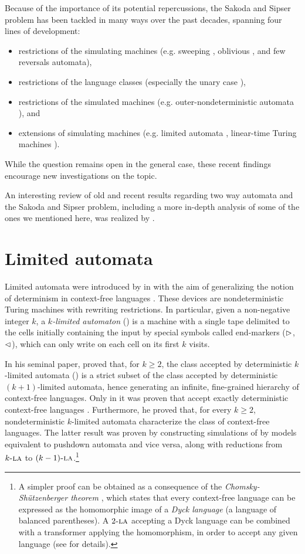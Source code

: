Because of the importance of its potential repercussions, the Sakoda and Sipser problem has been tackled in many ways over the past decades, spanning four lines of development:
\begin{itemize}
	\item restrictions of the simulating machines (e.g. sweeping \cite{Sip80}, oblivious \cite{HroSch03}, and few reversals \cite{Kap13} automata),
	\item restrictions of the language classes (especially the unary case \cite{GefMer+07}),
	\item restrictions of the simulated machines (e.g. outer-nondeterministic automata \cite{GefGui+14,KapPig15}), and
	\item extensions of simulating machines (e.g. limited automata \cite{PigPis14,PigPri19,GuiPri19,PigPri+22}, linear-time Turing machines \cite{Pru14,GuiPig+18,Hen65,GuiPig+23,Har68}).
\end{itemize}
While the question remains open in the general case, these recent findings encourage new investigations on the topic.

An interesting review of old and recent results regarding two way automata and the Sakoda and Sipser problem, including a more in-depth analysis of some of the ones we mentioned here, was realized by .


\section{Limited automata}
Limited automata were introduced by  in \citeyear{Hib67} with the aim of generalizing the notion of determinism in context-free languages \cite{Hib67}.
These devices are nondeterministic Turing machines with rewriting restrictions.
In particular, given a non-negative integer $k$, a \emph{$k$-limited automaton} (\kLA) is a machine with a single tape delimited to the cells initially containing the input by special symbols called end-markers ($\rhd$,$\lhd$), which can only write on each cell on its first $k$ visits.

In his seminal paper, \citeauthor{Hib67} proved that, for $k\ge2$, the class accepted by deterministic $k$-limited automata (\kDLA) is a strict subset of the class accepted by deterministic $(k+1)$-limited automata, hence generating an infinite, fine-grained hierarchy of context-free languages.
Only in \citeyear{PigPis15} it was proven that  accept exactly deterministic context-free languages \cite{PigPis15}.
Furthermore, he proved that, for every $k\ge2$, nondeterministic $k$-limited automata characterize the class of context-free languages.
The latter result was proven by constructing simulations of  by models equivalent to pushdown automata and vice versa, along with reductions from $k\textsc{-la}$ to $(k-1)\textsc{-la}$.\footnote{%
	A simpler proof can be obtained as a consequence of the \emph{Chomsky-Shützenberger theorem} \cite{ChoSch63}, which states that every context-free language can be expressed as the homomorphic image of a \emph{Dyck language} (a language of balanced parentheses).
	A $2\textsc{-la}$ accepting a Dyck language can be combined with a transformer applying the homomorphism, in order to accept any given language (see \cite{Pig19} for details).}


